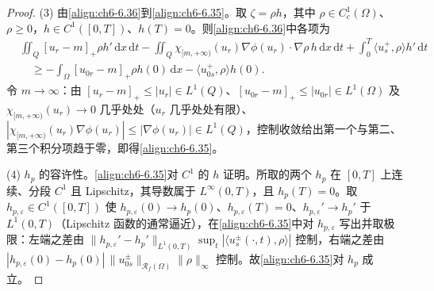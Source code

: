 \documentclass[../../main.tex]{subfiles}%
\begin{document}
\begin{proof}
(3) 由\eqref{align:ch6-6.36}到\eqref{align:ch6-6.35}。取 $\zeta=\rho h$，其中 $\rho\in C^1_c(\Omega)$、$\rho\geqslant0$，$h\in C^1([0,T])$、$h(T)=0$。则\eqref{align:ch6-6.36}中各项为
\begin{align*}
&\iint_Q[u_r-m]_+\rho h'\,\mathrm{d}x\,\mathrm{d}t
-\iint_Q\chi_{[m,+\infty)}(u_r)\nabla\phi(u_r)\cdot\nabla\rho\,h\,\mathrm{d}x\,\mathrm{d}t
+\int_0^T\langle u^+_s,\rho\rangle h'\,\mathrm{d}t\\
&\quad\geqslant-\int_\Omega[u_{0r}-m]_+\rho h(0)\,\mathrm{d}x-\langle u^+_{0s},\rho\rangle h(0).
\end{align*}
令 $m\to\infty$：由 $[u_r-m]_+\leqslant|u_r|\in L^1(Q)$、$[u_{0r}-m]_+\leqslant|u_{0r}|\in L^1(\Omega)$ 及 $\chi_{[m,+\infty)}(u_r)\to0$ 几乎处处（$u_r$ 几乎处处有限）、$|\chi_{[m,+\infty)}(u_r)\nabla\phi(u_r)|\leqslant|\nabla\phi(u_r)|\in L^1(Q)$，控制收敛给出第一个与第二、第三个积分项趋于零，即得\eqref{align:ch6-6.35}。

(4) $h_p$ 的容许性。\eqref{align:ch6-6.35}对 $C^1$ 的 $h$ 证明。所取的两个 $h_p$ 在 $[0,T]$ 上连续、分段 $C^1$ 且 Lipschitz，其导数属于 $L^\infty(0,T)$，且 $h_p(T)=0$。取 $h_{p,\varepsilon}\in C^1([0,T])$ 使 $h_{p,\varepsilon}(0)\to h_p(0)$、$h_{p,\varepsilon}(T)=0$、$h_{p,\varepsilon}'\to h_p'$ 于 $L^1(0,T)$（Lipschitz 函数的通常逼近），在\eqref{align:ch6-6.35}中对 $h_{p,\varepsilon}$ 写出并取极限：左端之差由 $\|h_{p,\varepsilon}'-h_p'\|_{L^1(0,T)}\sup_t|\langle u^\pm_s(\cdot,t),\rho\rangle|$ 控制，右端之差由 $|h_{p,\varepsilon}(0)-h_p(0)|\,\|u^\pm_{0s}\|_{\mathscr{R}_f(\Omega)}\|\rho\|_\infty$ 控制。故\eqref{align:ch6-6.35}对 $h_p$ 成立。


\end{proof}
\end{document}
